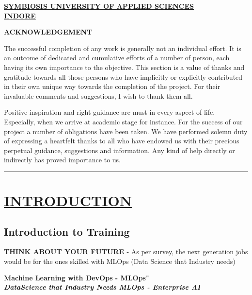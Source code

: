 \documentclass[12pt,oneside,a4paper]{report}
\begin{document}
\newpage 
\begin{large}
\begin{center}
\fontsize{18pt}{10pt}\selectfont
\underline{\textbf{SYMBIOSIS UNIVERSITY OF APPLIED SCIENCES}}\\
\vspace{5.0mm}\underline{\textbf{INDORE}}
\end{center}
\end{large}
\vspace{0.5in}
\begin{large}
\begin{center}
\fontsize{16pt}{10pt}\selectfont
\textbf{ACKNOWLEDGEMENT}
\end{center}
\end{large}
\vspace{0.4in}
The successful completion of any work is generally not an individual effort. It is an
outcome of dedicated and cumulative efforts of a number of person, each having its own
importance to the objective. This section is a value of thanks and gratitude towards all those
persons who have implicitly or explicitly contributed in their own unique way towards the
completion of the project. For their invaluable comments and suggestions, I wish to thank them
all.

\begin{flushleft}
Positive inspiration and right guidance are must in every aspect of life. Especially, when
we arrive at academic stage for instance. For the success of our project a number of obligations
have been taken. We have performed solemn duty of expressing a heartfelt thanks to all who have
endowed us with their precious perpetual guidance, suggestions and information. Any kind of help
directly or indirectly has proved importance to us.
\end{flushleft}\vspace{1.0in}
\begin{flushright}
\rule{150pt}{1pt}
\end{flushright}

\tableofcontents
\chapter{\underline{{INTRODUCTION}}}
\section{Introduction to Training}
\textbf{\large{THINK ABOUT YOUR FUTURE }}- As per survey, the next generation jobs would be for the ones skilled with MLOps (Data Science that Industry needs)\\
\begin{center}
\textbf{\Large{Machine Learning with DevOps - MLOps"}}\\
\textbf{\textit{\large{DataScience that Industry Needs MLOps - Enterprise AI}}}
\end{center}
\end{document}

